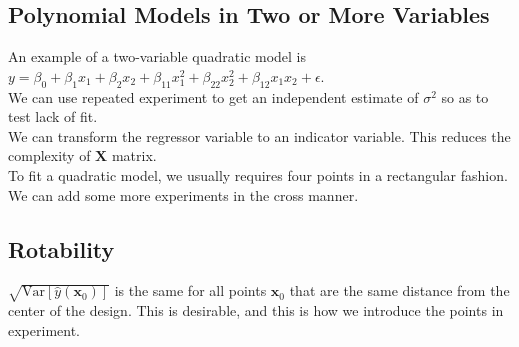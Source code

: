 \documentclass[11pt]{article}
\newcommand{\var}{\mathrm{Var}}
\theoremstyle{definition}
\begin{document}
\subsection{Polynomial Models in Two or More Variables}
An example of a two-variable quadratic model is $y=\beta_0+\beta_1x_1+\beta_2x_2+\beta_{11}x_1^2+\beta_{22}x_2^2+\beta_{12}x_1x_2+\epsilon$.\\
We can use repeated experiment to get an independent estimate of $\sigma^2$ so as to test lack of fit.\\
We can transform the regressor variable to an indicator variable. This reduces the complexity of $\bm{X}$ matrix.\\
To fit a quadratic model, we usually requires four points in a rectangular fashion. We can add some more experiments in the cross manner.
\subsection{Rotability}
$\sqrt{\var[\hat{y}(\bm{x}_0)]}$ is the same for all points $\bm{x}_0$ that are the same distance from the center of the design. This is desirable, and this is how we introduce the points in experiment.
\end{document}

